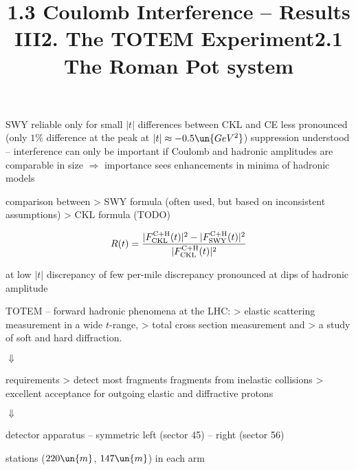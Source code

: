 
\> SWY reliable only for small $|t|$
\> differences between CKL and CE less pronounced (only $1\%$ difference at the peak at $|t| \approx -0.5\un{GeV^2}$)
\> suppression understood -- interference can only be important if Coulomb and hadronic amplitudes are comparable in size $\Rightarrow$ importance sees enhancements in minima of hadronic models


\newpage%
\title{1.3 Coulomb Interference -- Results III}

\> comparison between
\>> SWY formula (often used, but based on inconsistent assumptions)
\>> CKL formula (TODO)

$$R(t) = {|F^{\rm C+H}_{\rm CKL}(t)|^2 - |F^{\rm C+H}_{\rm SWY}(t)|^2 \over |F^{\rm C+H}_{\rm CKL}(t)|^2}$$

\centerline{}

\> at low $|t|$ discrepancy of few per-mile
\> discrepancy pronounced at dips of hadronic amplitude

\newpage%
\title{2. The TOTEM Experiment}

\> TOTEM -- forward hadronic phenomena at the LHC:
\>> elastic scattering measurement in a wide $t$-range,
\>> total cross section measurement and
\>> a study of soft and hard diffraction.

\centerline{$\Downarrow$}

\> requirements
\>> detect most fragments fragments from inelastic collisions
\>> excellent acceptance for outgoing elastic and diffractive protons

\centerline{$\Downarrow$}

\> detector apparatus -- symmetric left (sector 45) -- right (sector 56)


\newpage%
\title{2.1 The Roman Pot system}

 stations ($220\un{m}$, $147\un{m}$) in each arm


